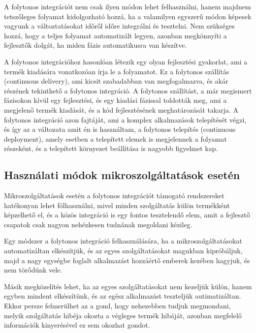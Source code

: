 \documentclass[11pt,magyar,a4paper,twoside,]{report}
\begin{document}
A folytonos integrációt nem csak ilyen módon lehet felhasználni, hanem
majdnem tetszőleges folyamat kidolgozható hozzá, ha a valamilyen
egyszerű módon képesek vagyunk a változtatásokat időről időre integrálni
és tesztelni. Nem szükséges hozzá, hogy a teljes folyamat automatizált
legyen, azonban megkönnyíti a fejlesztők dolgát, ha miden fázis
automatikusra van készítve.

A folytonos integrációhoz hasonlóan létezik egy olyan fejlesztési
gyakorlat, ami a termék kiadására vonatkozóan írja le a folyamatot. Ez a
folytonos szállítás\citep{continuous-delivery} (continuous delivery),
ami kicsit szabadabban van megfogalmazva, és akár részének tekinthető a
folytonos integráció. A folytonos szállítást, a már megismert fázisokon
kívül egy fejlesztési, és egy kiadási fázissal toldották meg, ami a
megjelenő termék kiadását, és a kód fejlesztésének meghatározását
takarja. A folytonos integráció azon fajtáját, ami a komplex
alkalmazások telepítését végzi, és így az a változata amit én is
használtam, a folytonos telepítés (continuous deployment), amely esetben
a telepített elemek is megjelennek a folyamat részeként, és a telepített
környezet beállítása is nagyobb figyelmet kap.

\subsection{Használati módok mikroszolgáltatások
esetén}\label{hasznuxe1lati-muxf3dok-mikroszolguxe1ltatuxe1sok-esetuxe9n}

Mikroszolgáltatások esetén a folytonos integrációt támogató rendszereket
hatékonyan lehet fölhasználni, mivel minden szolgáltatás külön
termékként képzelhető el, és a közös integráció is egy fontos
tesztelendő elem, amit a fejlesztő csapatok csak nagyon nehézkesen
tudnának megoldani kézileg.

Egy módszer a folytonos integráció felhasználására, ha a
mikroszolgáltatásokat automatizáltan elkészítjük, és az egyes
szolgáltatásokat magukban kipróbáljuk, majd a nagy egységbe foglalt
alkalmazást hozzáértő emberek kezében hagyjuk, és nem törődünk vele.

Másik megközelítés lehet, ha az egyes szolgáltatásokat nem kezeljük
külön, hanem egyben mindent elkészítünk, és az egész alkalmazást
teszteljük autimatizáltan. Ekkor persze felmerülhet az a gond, hogy
nehezebben tudjuk megmondani, melyik szolgáltatás hibéja okozta a
végleges termék hibáját, azonban megfelelő információk kinyerésével ez
sem okozhat gondot.
\end{document}
